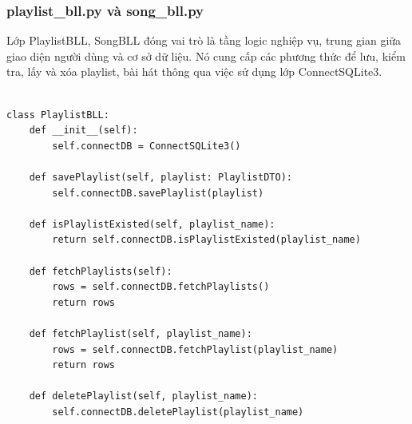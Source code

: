 \documentclass[a4paper]{article}
\begin{document}
\subsubsection{playlist\_bll.py và song\_bll.py}
Lớp PlaylistBLL, SongBLL đóng vai trò là tầng logic nghiệp vụ, trung gian giữa giao diện người dùng và cơ sở dữ liệu. Nó cung cấp các phương thức để lưu, kiểm tra, lấy và xóa playlist, bài hát thông qua việc sử dụng lớp ConnectSQLite3. 
\begin{mdframed}[hidealllines=true,backgroundcolor=magenta!10]
\begin{lstlisting}

class PlaylistBLL:
    def __init__(self):
        self.connectDB = ConnectSQLite3()

    def savePlaylist(self, playlist: PlaylistDTO):
        self.connectDB.savePlaylist(playlist)

    def isPlaylistExisted(self, playlist_name):
        return self.connectDB.isPlaylistExisted(playlist_name)

    def fetchPlaylists(self):
        rows = self.connectDB.fetchPlaylists()
        return rows

    def fetchPlaylist(self, playlist_name):
        rows = self.connectDB.fetchPlaylist(playlist_name)
        return rows

    def deletePlaylist(self, playlist_name):
        self.connectDB.deletePlaylist(playlist_name)

\end{lstlisting}
\end{mdframed}
\end{document}
